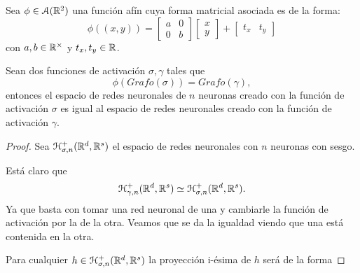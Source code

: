 \begin{aportacionOriginal}

\begin{teorema}\label{teo:eficacia-funciones-activation}
    \label{teo:equivalencia-grafos-activation-function}
    Sea $\phi \in \mathcal{A}(\mathbb{R}^2)$ una función afín 
    cuya forma matricial asociada es de la forma:  
    \begin{equation}
        \phi((x,y)) =  
        \begin{bmatrix}
            a & 0 \\
             0& b 
        \end{bmatrix}
        \begin{bmatrix}
            x \\
            y
        \end{bmatrix}
        +
        \begin{bmatrix}
            t_x  & t_y
        \end{bmatrix}
    \end{equation}
    con $a,b \in \mathbb{R}^\times$ y $t_x, t_y \in \mathbb{R}$.

    Sean dos funciones de activación $\sigma, \gamma$ tales que 
    \begin{equation*}
        \phi(Grafo(\sigma)) = Grafo(\gamma),
    \end{equation*}
    entonces 
    el espacio de redes neuronales de $n$ neuronas creado con la función de activación $\sigma$ es  
    igual al espacio de redes neuronales creado con la función de activación $\gamma$. 
\end{teorema}
\begin{proof}
    Sea $\mathcal{H}^+_{\sigma, n}(\mathbb{R}^d, \mathbb{R}^s)$ el espacio de redes neuronales con $n$ neuronas con sesgo. 

    Está claro que 
    \begin{equation*}
        \mathcal{H}^+_{\gamma, n}(\mathbb{R}^d, \mathbb{R}^s) 
        \simeq 
        \mathcal{H}^+_{\sigma, n}(\mathbb{R}^d, \mathbb{R}^s).
    \end{equation*}
    Ya que basta con tomar una red neuronal de una y cambiarle la función de activación por la de la otra. 
    Veamos 
    que se da la igualdad viendo que una está contenida en la otra. 

    Para cualquier $h  \in \mathcal{H}^+_{\sigma, n}(\mathbb{R}^d, \mathbb{R}^s)$
    la proyección i-ésima de $h$ será de la forma 


\end{proof}
\end{aportacionOriginal}
